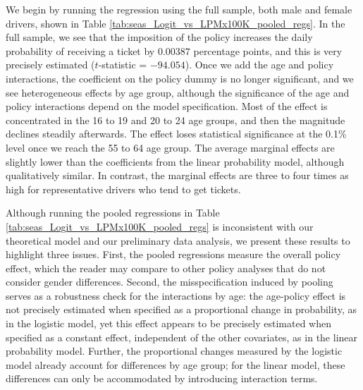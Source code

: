 We begin by running the regression using the full sample, 
both male and female drivers, 
shown in 
Table \ref{tab:seas_Logit_vs_LPMx100K_pooled_regs}.
% 
In the full sample, we see that the imposition of the policy increases the daily probability 
of receiving a ticket by $0.00387$ percentage points, 
and this is very precisely estimated ($t$-statistic = $-94.054$). 
Once we add the age and policy interactions, 
the coefficient on the policy dummy is no longer significant, 
and we see heterogeneous effects by age group, 
% 
although the significance of the age and policy interactions
depend on the model specification. 
% 
Most of the effect is concentrated in the 16 to 19 and 20 to 24 age groups, 
and then the magnitude declines steadily afterwards. 
The effect loses statistical significance at the 0.1\% level once we reach the 55 to 64 age group.
% 
The average marginal effects are slightly lower than the coefficients 
from the linear probability model, although qualitatively similar. 
In contrast, the marginal effects are three to four times as high
for representative drivers who tend to get tickets. 



Although running the pooled regressions in 
Table \ref{tab:seas_Logit_vs_LPMx100K_pooled_regs}
is inconsistent with our theoretical model and our preliminary data analysis, 
we present these results to highlight three issues. 
% 
First, the pooled regressions measure the overall policy effect, 
which the reader may compare to other policy analyses that do not
consider gender differences. 
% 
Second, the misspecification induced by pooling serves as a robustness check
for the interactions by age: 
the age-policy effect is not precisely estimated when specified as 
a proportional change in probability, 
as in the logistic model, 
yet this effect appears to be precisely estimated when specified as 
a constant effect, independent of the other covariates, 
as in the linear probability model.
%
Further, the proportional changes measured by the logistic model 
already account for differences by age group; 
for the linear model, these differences can only be accommodated 
by introducing interaction terms.

